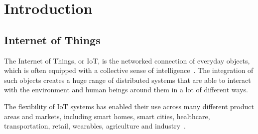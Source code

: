 \documentclass[runningheads]{llncs}
\begin{document}
\section{Introduction}\label{sec:introduction}

\subsection{Internet of Things}

The Internet of Things, or IoT, is the networked connection of everyday objects, which is often equipped with a collective sense of intelligence~\cite{Xia2012}. The integration of such objects creates a huge range of distributed systems that are able to interact with the environment and human beings around them in a lot of different ways.

The flexibility of IoT systems has enabled their use across many different product areas and markets, including smart homes, smart cities, healthcare, transportation, retail, wearables, agriculture and industry~\cite{Rahul2017}.



\end{document}
